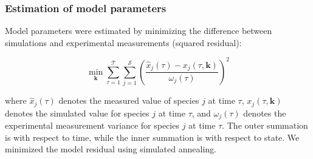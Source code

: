 \documentclass[10pt,twocolumn,twoside,final]{IEEEtran}
\begin{document}
\subsubsection*{Estimation of model parameters}
Model parameters were estimated by minimizing the difference between simulations and experimental measurements (squared residual):

\begin{equation}\label{eqn:objective-function}
	\min_{\mathbf{k}} \sum_{\tau=1}^{\mathcal{T}}\sum_{j=1}^{\mathcal{S}}\left(\frac{\hat{x}_{j}\left(\tau\right) - x_{j}\left(\tau,\mathbf{k}\right)}{\omega_{j}\left(\tau\right)}\right)^{2}
\end{equation}

where $\hat{x}_{j}\left(\tau\right)$ denotes the measured value of species $j$ at time $\tau$, $x_{j}\left(\tau,\mathbf{k}\right)$ denotes the simulated
value for species $j$ at time $\tau$, and $\omega_{j}\left(\tau\right)$ denotes the experimental measurement variance for species $j$ at time $\tau$.
The outer summation is with respect to time, while the inner summation is with respect to state. We minimized the model residual using simulated annealing.



\end{document}

